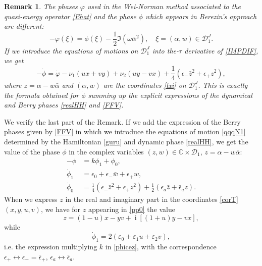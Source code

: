 \documentclass[12pt]{amsart}
\numberwithin{equation}{section}
\newtheorem{Remark}{Remark}
\theoremstyle{definition}
\begin{document}
\begin{Remark}\label{REMPS}
The phases $\varphi$ used in the Wei-Norman method  associated to the
quasi-energy  operator \eqref{Ehat} and the phase $\phi$ which
appears in Berezin's approach are different: 
\begin{equation}\label{IMPDIF}
-\varphi(\xi)=\phi(\xi)-\frac{1}{2}\Im(\omega\bar{\alpha}^2),\quad \xi=(\alpha,w)\in{{\mathcal{{D}}}}^J_1.
\end{equation}
If we introduce the equations of motions  on ${{\mathcal{{D}}}}^J_1$
into the-$\tau$ derivative of \eqref{IMPDIF},  we get
\begin{equation}\label{fiPHI}
-\dot{\phi}=\dot{\varphi}
-\nu_1(ux+vy)+\nu_2(uy-vx)+\frac{1}{4}(\epsilon_-\bar{z}^2+\epsilon_+z^2), \end{equation} 
where $z=\alpha-w\bar{\alpha}$ and $(\alpha,w)$ are the coordinates \eqref{txi} on
${{\mathcal{{D}}}}^J_1$. This is exactly the formula obtained for $\dot{\phi}$
summing up  the explicit
expressions of the dynamical and Berry phases  \eqref{realHH} and \eqref{FFV}.
\end{Remark}
We verify the last part of the Remark. 
If we add the  expression of the Berry phases given by
\eqref{FFV} in which we introduce the equations of motion
\eqref{qqqN1} determined by the Hamiltonian  \eqref{guru} and dynamic
phase \eqref{realHH}, we get  the value of  the
phase $\phi$  in the complex  variables
$(z,w)\in{\ensuremath{\mathbb{C}}}\times{{\mathcal{{D}}}}_1$, $z=\alpha-w\bar{\alpha}$:
\begin{subequations}\label{pp}
\begin{align}-{\phi} & =k{\phi}_1 +{\phi}_0,\\
\dot{\phi}_1 & = \epsilon_0+\epsilon_-\bar{w}+\epsilon_+w,\label{pp1}\\
\dot{\phi}_0 & = \frac{1}{4}(\epsilon_-\bar{z}^2+\epsilon_+z^2)+
\frac{1}{2} (\epsilon_a\bar{z}+\bar{\epsilon}_az) \label{pp0}. 
\end{align}
\end{subequations}
When we express $z$ in the real and imaginary part in the coordinates \eqref{corT}
$(x,y,u,v)$, we have for $z$ appearing in \eqref{pp0} the value
$$z=(1-u)x-yv+{\operatorname{i}} [(1+u)y-vx],$$
while $$\dot{\phi}_1=2(\varepsilon_0+\varepsilon_1u +\varepsilon_2 v),$$
i.e. the expression  multiplying   $k$ in    \eqref{phicez},
with the correspondence $\epsilon_+\leftrightarrow
\epsilon_-=\bar{\epsilon}_+$, $\epsilon_a\leftrightarrow
\bar{\epsilon}_a$.  \\[3ex]
\end{document}
